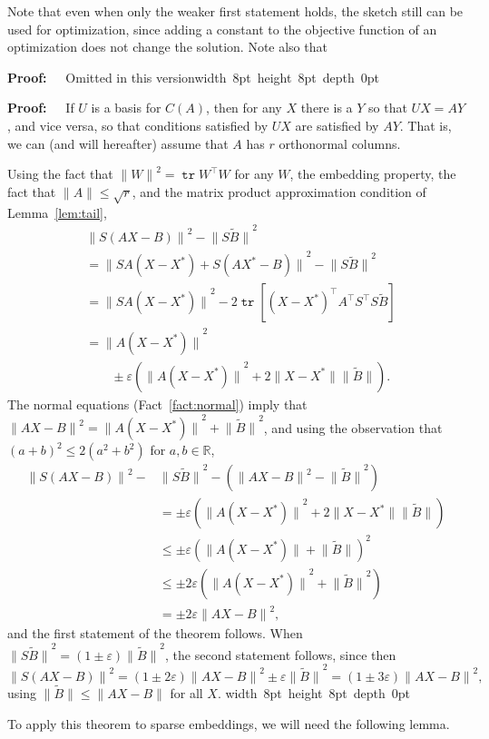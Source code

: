 \documentclass{sig-alternate}
\newcommand{\norm}[1]{{\| #1 \|}}
\DeclareMathOperator{\tr}{\mathtt{tr}}
\newcommand\STOComitedproof[1] {\ifSTOC \begin{proof} Omitted in this version\end{proof}\else #1 \fi }
\newcommand{\eps}{\varepsilon}
\newcommand{\R}{{\mathbb R}}
\def\FullBox{\hbox{\vrule width 8pt height 8pt depth 0pt}}
\def\qed{\ifmmode\qquad\FullBox\else{\unskip\nobreak\hfil
\penalty50\hskip1em\null\nobreak\hfil\FullBox
\parfillskip=0pt\finalhyphendemerits=0\endgraf}\fi}
\newenvironment{proof}{\begin{trivlist} \item {\bf Proof:~~}}
  {\qed\end{trivlist}}
\begin{document}
Note that even when only the weaker first statement holds, the sketch still can be used
for optimization, since adding a constant to the objective function of an
optimization does not change the solution. Note also that 

\STOComitedproof{
\begin{proof}
If $U$ is a basis for $C(A)$, then
for any $X$ there is a $Y$ so that $UX=AY$,
and vice versa, so that conditions satisfied by $UX$ are satisfied
by $AY$. That is, we can (and will hereafter)
assume that $A$ has $r$ orthonormal columns.

Using the fact that $\norm{W}^2 = \tr W^\top W$ for any $W$,
the embedding property, the fact that $\norm{A}\le\sqrt{r}$,
and the matrix product approximation condition
of Lemma~\ref{lem:tail},
\begin{align*}
& \norm{S(AX-B)}^2 -  \norm{S\tilde B}^2
	\\ & = \norm{SA(X-X^*)+ S(AX^* - B)}^2  - \norm{S\tilde B}^2
	\\ &  = \norm{SA(X-X^*)}^2 
		- 2\tr [(X-X^*)^\top A^\top S^\top S\tilde B]
	\\ & = \norm{A(X-X^*)}^2 
	\\ & \qquad
		\pm \eps(\norm{A(X-X^*)}^2 
			+ 2 \norm{X-X^*} \norm{\tilde B}).
\end{align*}
The normal equations (Fact~\ref{fact:normal}) imply
that $\norm{AX-B}^2 = \norm{A(X-X^*)}^2 + \norm{\tilde B}^2$,
and using the observation that $(a+b)^2\le 2(a^2+b^2)$ for $a,b\in\R$,
\begin{align*}
 \norm{S(AX-B)}^2  - & \norm{S\tilde B}^2 - (\norm{AX-B}^2 - \norm{\tilde B}^2)
 	   \\ & = \pm \eps(\norm{A(X-X^*)}^2
			+ 2 \norm{X-X^*} \norm{\tilde B})
	\\ &  \le \pm \eps(\norm{A(X-X^*)} + \norm{\tilde B} )^2
	\\ & \le \pm 2\eps(\norm{A(X-X^*)}^2 + \norm{\tilde B}^2)
	\\ & = \pm 2\eps \norm{AX-B}^2,
\end{align*}
and the first statement of the theorem follows. When $\norm{S\tilde B}^2 = (1\pm\eps)\norm{\tilde B}^2$,
the second statement follows, since then
\[
\norm{S(AX-B)}^2 = (1\pm 2\eps)\norm{AX-B}^2 \pm\eps \norm{\tilde B}^2
	=  (1\pm 3\eps)\norm{AX-B}^2,
\]
using $\norm{\tilde B}\le \norm{AX-B}$ for all $X$.
\end{proof}
} 

To apply this theorem to sparse embeddings, we will need the following lemma.
\end{document}
